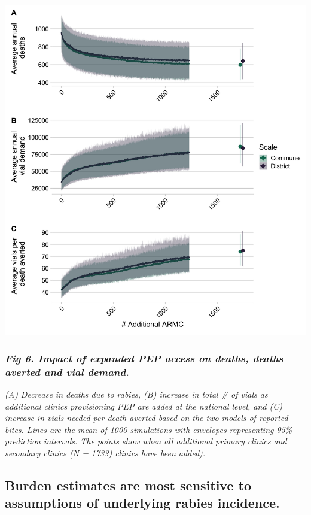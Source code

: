\documentclass[
]{book}
\begin{document}
\includegraphics[width=0.9\linewidth]{figs/ch2/fig6}

\hypertarget{fig-6.-impact-of-expanded-pep-access-on-deaths-deaths-averted-and-vial-demand.}{%
\subsubsection{\texorpdfstring{\emph{Fig 6. Impact of expanded PEP access on deaths, deaths averted and vial demand.}}{Fig 6. Impact of expanded PEP access on deaths, deaths averted and vial demand.}}\label{fig-6.-impact-of-expanded-pep-access-on-deaths-deaths-averted-and-vial-demand.}}

\emph{(A) Decrease in deaths due to rabies, (B) increase in total \# of vials
as additional clinics provisioning PEP are added at the national level,
and (C) increase in vials needed per death averted based on the two
models of reported bites. Lines are the mean of 1000 simulations with
envelopes representing 95\% prediction intervals. The points show when
all additional primary clinics and secondary clinics (N = 1733) clinics
have been added).}

\hypertarget{burden-estimates-are-most-sensitive-to-assumptions-of-underlying-rabies-incidence.}{%
\subsection{Burden estimates are most sensitive to assumptions of underlying rabies incidence.}\label{burden-estimates-are-most-sensitive-to-assumptions-of-underlying-rabies-incidence.}}
\end{document}
